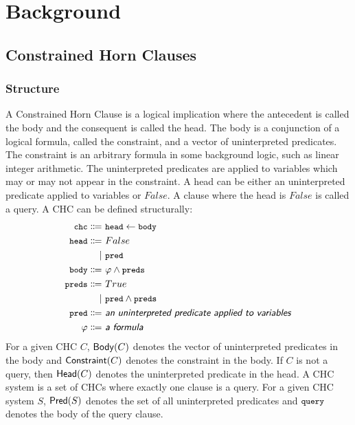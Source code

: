 \section{Background}
\label{sec:background}

\subsection{Constrained Horn Clauses}
\label{sec:chcs}

\subsubsection{Structure}
A Constrained Horn Clause is a logical implication where the
antecedent is called the body and the consequent is called the head.
%
The body is a conjunction of a logical formula, called the constraint,
and a vector of uninterpreted predicates. The constraint is an arbitrary
formula in some background logic, such as linear integer arithmetic.
%
The uninterpreted predicates are applied to variables which may or may
not appear in the constraint.
%
A head can be either an uninterpreted predicate applied to variables or $False$.
%
A clause where the head is $False$ is called a query. A CHC can be
defined structurally:
\begin{align*}
\cc{chc} \Coloneqq&~\cc{head} \gets \cc{body} \\
\cc{head} \Coloneqq&~False \\
  \mid&~\cc{pred} \\
\cc{body} \Coloneqq&~\varphi \wedge \cc{preds} \\
\cc{preds} \Coloneqq&~True \\
  \mid&~\cc{pred} \wedge \cc{preds} \\
\cc{pred} \Coloneqq&~\textsf{\emph{an uninterpreted predicate applied to variables}} \\
\varphi \Coloneqq&~\textsf{\emph{a formula}} \\
\end{align*}
%
For a given CHC $C$, $\mathsf{Body}(C)$ denotes the vector of uninterpreted
predicates in the body and $\mathsf{Constraint}(C)$ denotes the constraint in the
body.
%
If $C$ is not a query, then $\mathsf{Head}(C)$ denotes the uninterpreted
predicate in the head.
%
A CHC system is a set of CHCs where exactly one clause is a query.
%
For a given CHC system $S$, $\mathsf{Pred}( S )$ denotes the set of all
uninterpreted predicates and $\cc{query}$ denotes the body of the
query clause.


